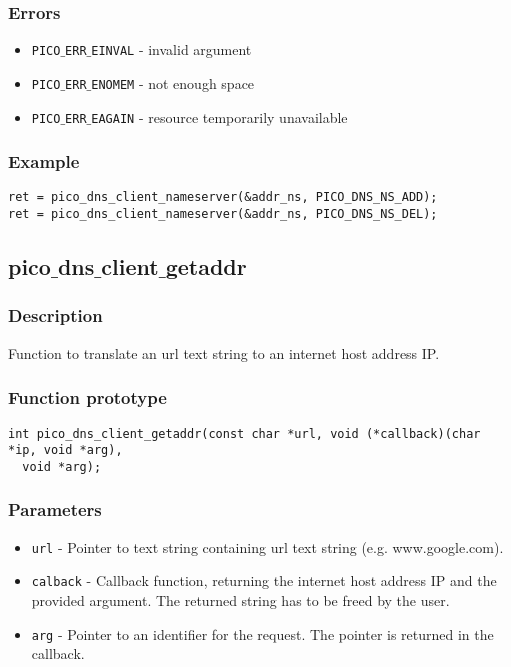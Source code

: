 \subsubsection*{Errors}
\begin{itemize}[noitemsep]
\item \texttt{PICO$\_$ERR$\_$EINVAL} - invalid argument
\item \texttt{PICO$\_$ERR$\_$ENOMEM} - not enough space
\item \texttt{PICO$\_$ERR$\_$EAGAIN} - resource temporarily unavailable
\end{itemize}

\subsubsection*{Example}
\begin{verbatim}
ret = pico_dns_client_nameserver(&addr_ns, PICO_DNS_NS_ADD);
ret = pico_dns_client_nameserver(&addr_ns, PICO_DNS_NS_DEL);
\end{verbatim}



\subsection{pico$\_$dns$\_$client$\_$getaddr}

\subsubsection*{Description}
Function to translate an url text string to an internet host address IP. 

\subsubsection*{Function prototype}
\begin{verbatim}
int pico_dns_client_getaddr(const char *url, void (*callback)(char *ip, void *arg), 
  void *arg);
\end{verbatim}

\subsubsection*{Parameters}
\begin{itemize}[noitemsep]
\item \texttt{url} - Pointer to text string containing url text string (e.g. www.google.com).
\item \texttt{calback} - Callback function, returning the internet host address IP and the provided argument. The returned string has to be freed by the user.
\item \texttt{arg} - Pointer to an identifier for the request. The pointer is returned in the callback.
\end{itemize}


